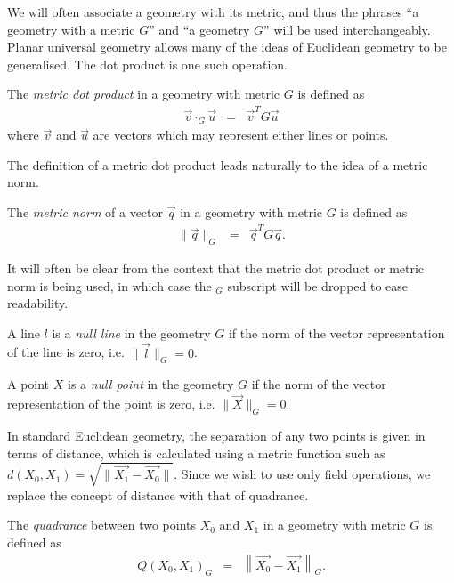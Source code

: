 We will often associate a geometry with its metric, and thus the phrases ``a geometry with a metric $G$'' and ``a geometry $G$'' will be used interchangeably.
Planar universal geometry allows many of the ideas of Euclidean geometry to be generalised.
The dot product is one such operation.

\begin{definition} The \emph{metric dot product} in a geometry with metric $G$ is defined as
\begin{eqnarray}
\vec{v}\cdot_G\vec{u} & = & \vec{v}^TG\vec{u}
\end{eqnarray}
where $\vec{v}$ and $\vec{u}$ are vectors which may represent either lines or points.
\end{definition}

The definition of a metric dot product leads naturally to the idea of a metric norm.

\begin{definition} The \emph{metric norm} of a vector $\vec{q}$ in a geometry with metric $G$ is defined as
\begin{eqnarray}
\|\vec{q}\|_G & = & \vec{q}^TG\vec{q}.
\end{eqnarray}
\end{definition}
It will often be clear from the context that the metric dot product or metric norm is being used, in which case the $_G$ subscript will be dropped to ease readability.


\begin{definition} A line $l$ is a \emph{null line} in the geometry $G$ if the norm of the vector representation of the line is zero, i.e. $\|\vec{l}\|_G = 0$.
\end{definition}

\begin{definition} A point $X$ is a \emph{null point} in the geometry $G$ if the norm of the vector representation of the point is zero, i.e. $\|\vec{X}\|_G = 0$.
\end{definition}

In standard Euclidean geometry, the separation of any two points is given in terms of distance, which is calculated using a metric function such as $d(X_0, X_1) = \sqrt{\|\vec{X_1} - \vec{X_0}\|}$.
Since we wish to use only field operations, we replace the concept of distance with that of quadrance.

\begin{definition} The \emph{quadrance} between two points $X_0$ and $X_1$ in a geometry with metric $G$ is defined as
\begin{eqnarray}
Q(X_0, X_1)_G & = & \left\|\vec{X_0} - \vec{X_1}\right\|_G.
\end{eqnarray}
\end{definition}

